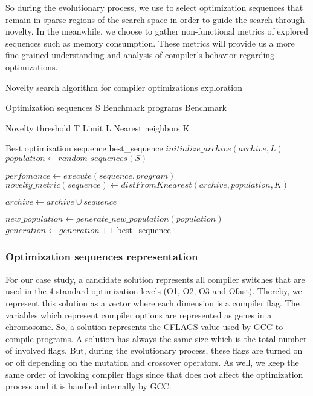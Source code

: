 So during the evolutionary process, we use to select optimization sequences that remain in sparse regions of the search space in order to guide the search through novelty. In the meanwhile, we choose to gather non-functional metrics of explored sequences such as memory consumption. These metrics will provide us a more fine-grained understanding and analysis of compiler's behavior regarding optimizations. 
\begin{algorithm}
	\caption{Novelty search algorithm for compiler optimizations exploration}
	\label{alg1}
	\begin{algorithmic}[1]
		\REQUIRE Optimization sequences S
		\REQUIRE Benchmark programs Benchmark
		
		\REQUIRE Novelty threshold T
		\REQUIRE Limit L
		\REQUIRE Nearest neighbors K
		
		\ENSURE Best optimization sequence best\_sequence
		\STATE $initialize\_archive(archive,L)$
		\STATE $population \gets random\_sequences(S)$
		\REPEAT
		
		\STATE 	$perfomance \gets execute(sequence,program)$
		\ENDFOR
		\STATE	$novelty\_metric(sequence) \gets distFromKnearest(archive,population,K)$
		
		\STATE	$archive \gets archive \cup sequence$
		\ENDIF
		
		\ENDFOR
		
		\STATE		$new\_population \gets generate\_new\_population(population)$
		\STATE		$generation \gets generation + 1$
		\RETURN best\_sequence
	\end{algorithmic}
\end{algorithm}
\subsubsection{Optimization sequences representation}
For our case study, a candidate solution represents all compiler switches that are used in the 4 standard optimization levels (O1, O2, O3 and Ofast). Thereby, we represent this solution as a vector where each dimension is a compiler flag. The variables which represent compiler options are represented as genes in a chromosome. So, a solution represents the CFLAGS value used by GCC to compile programs.
A solution has always the same size which is the total number of involved flags. But, during the evolutionary process, these flags are turned on or off depending on the mutation and crossover operators. As well, we keep the same order of invoking compiler flags since that does not affect the optimization process and it is handled internally by GCC.

